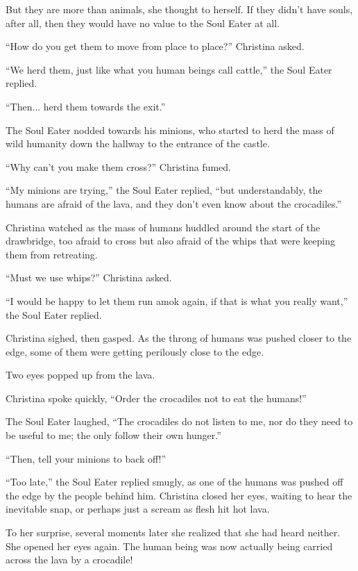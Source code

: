 \documentclass[showtrims,b6paper,draft,10pt]{memoir}
\begin{document}
But they are more than animals, she thought to herself.  If they didn't have souls, after all, then they would have no value to the Soul Eater at all.

``How do you get them to move from place to place?'' Christina asked.

``We herd them, just like what you human beings call cattle,'' the Soul Eater replied.

``Then... herd them towards the exit.''

The Soul Eater nodded towards his minions, who started to herd the mass of wild humanity down the hallway to the entrance of the castle.

\timeskip

``Why can't you make them cross?''  Christina fumed.

``My minions are trying,'' the Soul Eater replied, ``but understandably, the humans are afraid of the lava, and they don't even know about the crocadiles.''

Christina watched as the mass of humans huddled around the start of the drawbridge, too afraid to cross but also afraid of the whips that were keeping them from retreating.

``Must we use whips?'' Christina asked.

``I would be happy to let them run amok again, if that is what you really want,'' the Soul Eater replied.

Christina sighed, then gasped.  As the throng of humans was pushed closer to the edge, some of them were getting perilously close to the edge.

Two eyes popped up from the lava.

Christina spoke quickly, ``Order the crocadiles not to eat the humans!''

The Soul Eater laughed, ``The crocadiles do not listen to me, nor do they need to be useful to me;  the only follow their own hunger.''

``Then, tell your minions to back off!''

``Too late,'' the Soul Eater replied smugly, as one of the humans was pushed off the edge by the people behind him.  Christina closed her eyes, waiting to hear the inevitable snap, or perhaps just a scream as flesh hit hot lava.

To her surprise, several moments later she realized that she had heard neither.  She opened her eyes again.  The human being was now actually being carried across the lava by a crocadile!
\end{document}
